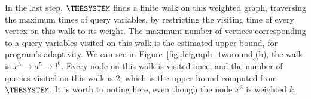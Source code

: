  
 In the last step, $\THESYSTEM$ finds a finite walk on this weighted graph, 
traversing the maximum times of query variables, by restricting the visiting time of every vertex on this walk to its weight.
The maximum number of vertices corresponding to a query variables visited on this walk is the estimated upper bound, for program's adaptivity. 
We can see in Figure~\ref{fig:dcfgraph_tworound}(b), the walk is $x^3 \to a^5 \to l^6$.
Every node on this walk is visited once, and the number of queries visited on this walk is $2$, which is the upper bound computed from $\THESYSTEM$.
It is worth to noting here, even though the node $x^3$ is weighted $k$, 
